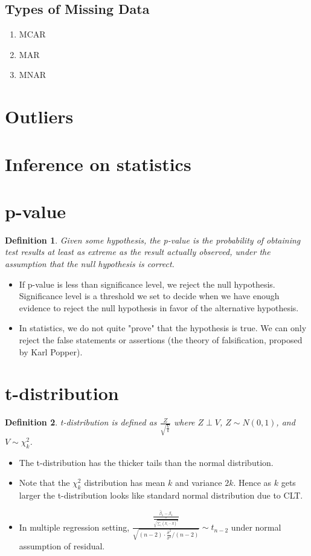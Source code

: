 \documentclass[11pt,reqno]{amsart}
\newtheorem{definition}{Definition}
\theoremstyle{remark}
\begin{document}
\subsection*{Types of Missing Data}
\begin{enumerate}
\item MCAR
\item MAR
\item MNAR
\end{enumerate}


\section*{Outliers}
\section*{Inference on statistics}
\section*{p-value}
\begin{definition}
Given some hypothesis, the p-value is the probability of obtaining test results at least as extreme as 
the result actually observed, under the assumption that the null hypothesis is correct.
\end{definition}
\begin{itemize}
\item If p-value is less than significance level, we reject the null hypothesis. Significance 
level is a threshold we set to decide when we have enough evidence to reject the null hypothesis in favor of the alternative hypothesis.
\item In statistics, we do not quite "prove" that the hypothesis is true. We can only reject the false statements or assertions (the theory of falsification, proposed by Karl Popper). 
\end{itemize}

\section*{t-distribution}
\begin{definition}
t-distribution is defined as $\frac Z{\sqrt{\frac Vk}}$ where $Z \perp V$, $Z\sim N(0,1)$, and $V\sim \chi_k^2$.
\end{definition}
\begin{itemize}
\item The t-distribution has the thicker tails than the normal distribution.
\item Note that the $\chi_k^2$ distribution has mean $k$ and variance $2k$. Hence as $k$ gets larger the t-distribution 
looks like standard normal distribution due to CLT. 
\item In multiple regression setting, $\frac{\frac{\hat\beta_1-\beta_1}{\frac \sigma{\sqrt{\sum_i(X_i-\bar X)^2}}}}
{\sqrt{(n-2)\cdot\frac{\hat \sigma^2}{\sigma^2}/(n-2)}}\sim t_{n-2}$ under normal assumption of residual.
\end{itemize}
\end{document}

